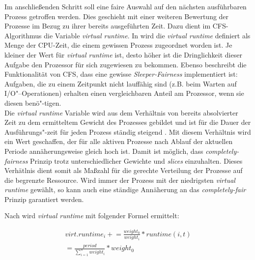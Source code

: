 Im anschließenden Schritt soll eine faire Auswahl auf den nächsten ausführbaren Prozess getroffen werden. Dies geschieht mit einer weiteren Bewertung der Prozesse im Bezug zu ihrer bereits ausgeführten Zeit. 
Dazu dient im CFS-Algorithmus die Variable \textit{virtual runtime}. In \cite{mjones} wird die \textit{virtual runtime} definiert als Menge der CPU-Zeit, die einem gewissen Prozess zugeordnet worden ist. Je kleiner der Wert für \textit{virtual runtime} ist, desto höher ist die Dringlichkeit dieser Aufgabe den Prozessor für sich zugewiesen zu bekommen. Ebenso beschreibt \cite{mjones} die Funktionalität von CFS, dass eine gewisse \textit{Sleeper-Fairness} implementiert ist: Aufgaben, die zu einem Zeitpunkt nicht lauffähig sind (z.B. beim Warten auf I/O"--Operationen) erhalten ei\-nen vergleichbaren Anteil am Prozessor, wenn sie diesen benö"-tigen.\\
Die \textit{virtual runtime} Variable wird aus dem Verhältnis von bereits absolvierter Zeit zu dem ermitteltem Gewicht des Prozesses gebildet und ist für die Dauer der Ausführungs"-zeit für jeden Prozess ständig steigend \cite{rlove}. Mit diesem Verhältnis wird ein Wert geschaffen, der für alle aktiven Prozesse nach Ablauf der aktuellen Periode annäherungs\-weise gleich hoch ist. Damit ist möglich, dass \textit{completely-fairness} Prinzip trotz unterschiedlicher Gewichte und \textit{slices} einzuhalten. Dieses Verhätlnis dient somit als Maßzahl für die gerechte Verteilung der Prozesse auf die begrenzte Ressource. Wird immer der Prozess mit der niedrigsten \textit{virtual runtime} gewählt, so kann auch eine ständige An\-nähe\-rung an das \textit{completely-fair} Prinzip garantiert werden.

Nach \cite{paperfairness} wird \textit{virtual runtime} mit folgender Formel ermittelt:

\begin{multline}
virt. runtime_{i} \mathrel{+}= \frac{weight_{0}}{weight_{i}} * runtime(i,t) \\ = \frac{period}{\sum_{i=1}^{n} weight_{i}} * weight_{0}
\label{eq:vruntime}
\end{multline}


